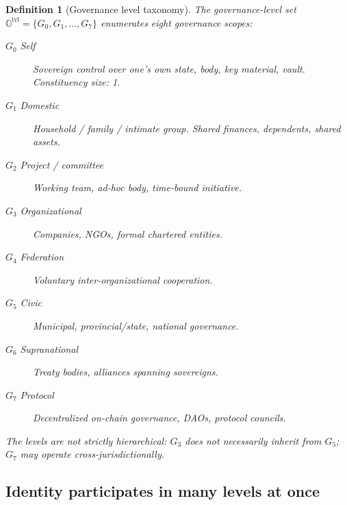 \documentclass[11pt,a4paper,parskip=half-,DIV=12,headings=standardclasses]{scrartcl}
\theoremstyle{ncthm}
\theoremstyle{ncdef}
\newtheorem{definition}[theorem]{Definition}
\begin{document}
\begin{definition}[Governance level taxonomy]\label{def:g-levels}
The governance-level set $\mathbb{G}^{\mathrm{lvl}} = \{G_0, G_1,
\ldots, G_7\}$ enumerates eight governance scopes:
\begin{description}
\item[$G_0$ \emph{Self}] Sovereign control over one's own state, body,
  key material, vault. Constituency size: 1.
\item[$G_1$ \emph{Domestic}] Household / family / intimate group.
  Shared finances, dependents, shared assets.
\item[$G_2$ \emph{Project / committee}] Working team, ad-hoc
  body, time-bound initiative.
\item[$G_3$ \emph{Organizational}] Companies, NGOs, formal chartered
  entities.
\item[$G_4$ \emph{Federation}] Voluntary inter-organizational
  cooperation.
\item[$G_5$ \emph{Civic}] Municipal, provincial/state, national
  governance.
\item[$G_6$ \emph{Supranational}] Treaty bodies, alliances spanning
  sovereigns.
\item[$G_7$ \emph{Protocol}] Decentralized on-chain governance,
  DAOs, protocol councils.
\end{description}
The levels are not strictly hierarchical: $G_3$ does not necessarily
inherit from $G_5$; $G_7$ may operate cross-jurisdictionally.
\end{definition}

\subsection{Identity participates in many levels at once}
\end{document}
